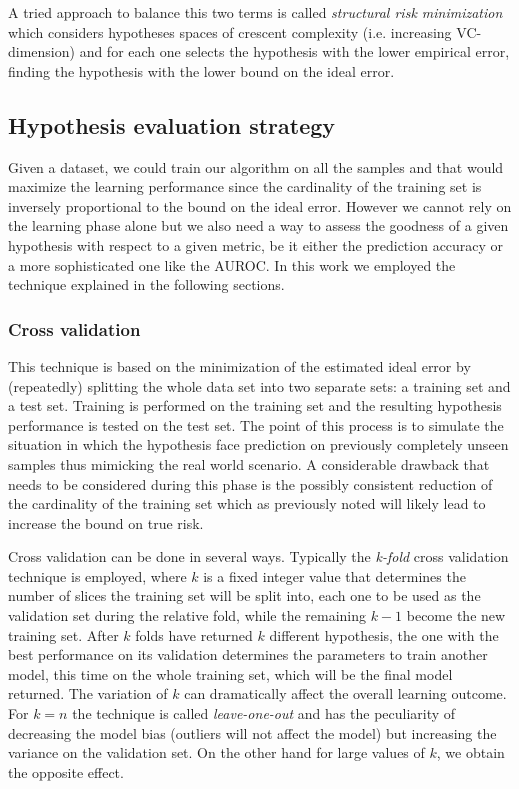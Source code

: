 A tried approach to balance this two terms is called \emph{structural risk
minimization} which considers hypotheses spaces of crescent complexity
(i.e. increasing VC-dimension) and for each one selects the hypothesis with
the lower empirical error, finding the hypothesis with the lower bound on the
ideal error.

\subsection{Hypothesis evaluation strategy}
\label{subsec:evaluation}

Given a dataset, we could train our algorithm on all the samples and that would
maximize the learning performance since the cardinality of the training set is
inversely proportional to the bound on the ideal error.
However we cannot rely on the learning phase alone but we also need a way to
assess the goodness of a given hypothesis with respect to a given metric, be it 
either the prediction accuracy or a more sophisticated one like the AUROC.
In this work we employed the technique explained in the following sections.

\subsubsection{Cross validation}
\label{subsubsec:cv}
This technique is based on the minimization of the estimated ideal error by
(repeatedly) splitting the whole data set into two separate sets: a training set
and a test set.
Training is performed on the training set and the resulting hypothesis performance
is tested on the test set.
The point of this process is to simulate the situation in which the hypothesis
face prediction on previously completely unseen samples thus mimicking the real
world scenario.
A considerable drawback that needs to be considered during this phase is the 
possibly consistent reduction of the cardinality of the training set which as 
previously noted will likely lead to increase the bound on true risk.

Cross validation can be done in several ways. Typically the \emph{k-fold} cross
validation technique is employed, where $k$ is a fixed integer value that
determines the number of slices the training set will be split into, each one to
be used as the validation set during the relative fold, while the remaining $k-1$
become the new training set.
After $k$ folds have returned $k$ different hypothesis, the one with the best
performance on its validation determines the parameters to train another model,
this time on the whole training set, which will be the final model returned.
The variation of $k$ can dramatically affect the overall learning outcome.
For $k=n$ the technique is called \emph{leave-one-out} and has the peculiarity
of decreasing the model bias (outliers will not affect the model) but increasing
the variance on the validation set.
On the other hand for large values of $k$, we obtain the opposite effect.


